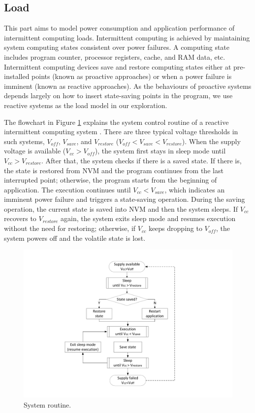 \subsection{Load} \label{load}

This part aims to model power consumption and application performance of intermittent computing loads. Intermittent computing is achieved by maintaining system computing states consistent over power failures. A computing state includes program counter, processor registers, cache, and RAM data, etc. Intermittent computing devices save and restore computing states either at pre-installed points (known as proactive approaches) or when a power failure is imminent (known as reactive approaches). As the behaviours of proactive systems depends largely on how to insert state-saving points in the program, we use reactive systems as the load model in our exploration. 

The flowchart in Figure \ref{Figure:routine} explains the system control routine of a reactive intermittent computing system \cite{6960060}. There are three typical voltage thresholds in such systems, $V_{off}$, $V_{save}$, and $V_{restore}$ ($V_{off} < V_{save} < V_{restore}$). When the supply voltage is available ($V_{cc} > V_{off}$), the system first stays in sleep mode until $V_{cc} > V_{restore}$. After that, the system checks if there is a saved state. If there is, the state is restored from NVM and the program continues from the last interrupted point; otherwise, the program starts from the beginning of application. The execution continues until $V_{cc} < V_{save}$, which indicates an imminent power failure and triggers a state-saving operation. During the saving operation, the current state is saved into NVM and then the system sleeps. If $V_{cc}$ recovers to $V_{restore}$ again, the system exits sleep mode and resumes execution without the need for restoring; otherwise, if $V_{cc}$ keeps dropping to $V_{off}$, the system powers off and the volatile state is lost.

\begin{figure}[H]
    \centering
    \includegraphics[width=12cm]{figure/work1/routine}
    \caption{System routine.}
    \label{Figure:routine}
\end{figure}


